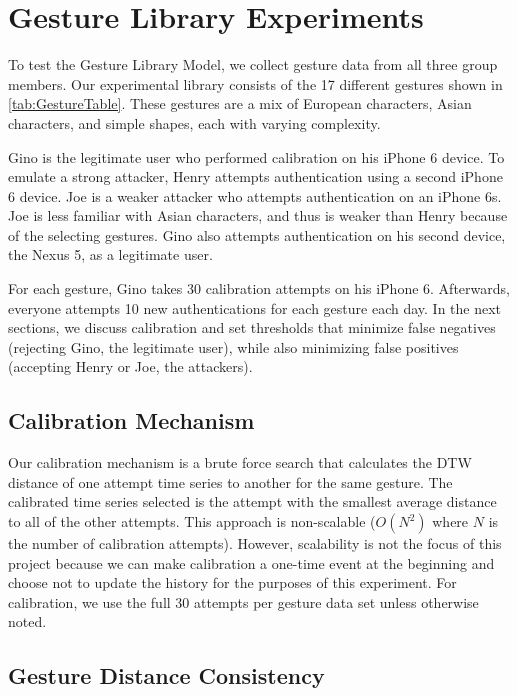 


\section{Gesture Library Experiments}
\label{sec:GestureLibrary}

To test the Gesture Library Model, we collect gesture data from all three group members. Our experimental library consists of the 17 different gestures shown in \autoref{tab:GestureTable}. These gestures are a mix of European characters, Asian characters, and simple shapes, each with varying complexity. 

Gino is the legitimate user who performed calibration on his iPhone 6 device. To emulate a strong attacker, Henry attempts authentication using a second iPhone 6 device. Joe is a weaker attacker who attempts authentication on an iPhone 6s. Joe is less familiar with Asian characters, and thus is weaker than Henry because of the selecting gestures. Gino also attempts authentication on his second device, the Nexus 5, as a legitimate user.

For each gesture, Gino takes 30 calibration attempts on his iPhone 6. Afterwards, everyone attempts 10 new authentications for each gesture each day. In the next sections, we discuss calibration and set thresholds that minimize false negatives (rejecting Gino, the legitimate user), while also minimizing false positives (accepting Henry or Joe, the attackers).

\subsection{Calibration Mechanism}

Our calibration mechanism is a brute force search that calculates the \gls{DTW} distance of one attempt time series to another for the same gesture. The calibrated time series selected is the attempt with the smallest average distance to all of the other attempts. This approach is non-scalable ($O(N^{2})$ where $N$ is the number of calibration attempts). However, scalability is not the focus of this project because we can make calibration a one-time event at the beginning and choose not to update the history for the purposes of this experiment. For calibration, we use the full 30 attempts per gesture data set unless otherwise noted.

\subsection{Gesture Distance Consistency}

